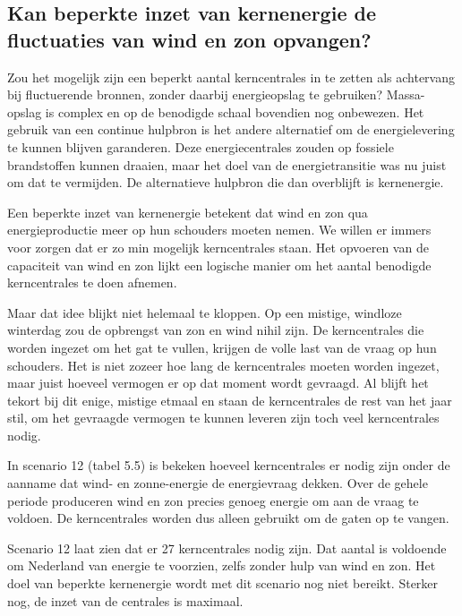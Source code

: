 \documentclass[
  11pt,
  a4paper,
]{book}
\begin{document}
\hypertarget{kan-beperkte-inzet-van-kernenergie-de-fluctuaties-van-wind-en-zon-opvangen}{%
\subsection{Kan beperkte inzet van kernenergie de fluctuaties van wind en zon opvangen?}\label{kan-beperkte-inzet-van-kernenergie-de-fluctuaties-van-wind-en-zon-opvangen}}

Zou het mogelijk zijn een beperkt aantal kerncentrales in te zetten als achtervang bij fluctuerende bronnen, zonder daarbij energieopslag te gebruiken? Massa-opslag is complex en op de benodigde schaal bovendien nog onbewezen. Het gebruik van een continue hulpbron is het andere alternatief om de energielevering te kunnen blijven garanderen. Deze energiecentrales zouden op fossiele brandstoffen kunnen draaien, maar het doel van de energietransitie was nu juist om dat te vermijden. De alternatieve hulpbron die dan overblijft is kernenergie.

Een beperkte inzet van kernenergie betekent dat wind en zon qua energieproductie meer op hun schouders moeten nemen. We willen er immers voor zorgen dat er zo min mogelijk kerncentrales staan. Het opvoeren van de capaciteit van wind en zon lijkt een logische manier om het aantal benodigde kerncentrales te doen afnemen.

Maar dat idee blijkt niet helemaal te kloppen. Op een mistige, windloze winterdag zou de opbrengst van zon en wind nihil zijn. De kerncentrales die worden ingezet om het gat te vullen, krijgen de volle last van de vraag op hun schouders. Het is niet zozeer hoe lang de kerncentrales moeten worden ingezet, maar juist hoeveel vermogen er op dat moment wordt gevraagd. Al blijft het tekort bij dit enige, mistige etmaal en staan de kerncentrales de rest van het jaar stil, om het gevraagde vermogen te kunnen leveren zijn toch veel kerncentrales nodig.

In scenario 12 (tabel 5.5) is bekeken hoeveel kerncentrales er nodig zijn onder de aanname dat wind- en zonne-energie de energievraag dekken. Over de gehele periode produceren wind en zon precies genoeg energie om aan de vraag te voldoen. De kerncentrales worden dus alleen gebruikt om de gaten op te vangen.

Scenario 12 laat zien dat er 27 kerncentrales nodig zijn. Dat aantal is voldoende om Nederland van energie te voorzien, zelfs zonder hulp van wind en zon. Het doel van beperkte kernenergie wordt met dit scenario nog niet bereikt. Sterker nog, de inzet van de centrales is maximaal.
\end{document}
